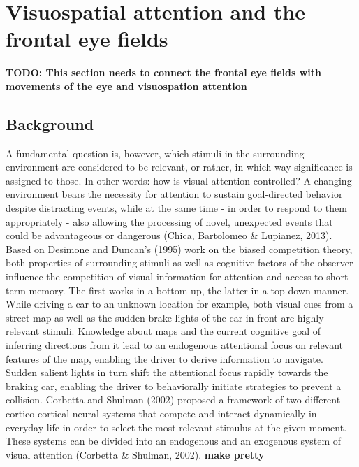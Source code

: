 \documentclass[a4paper, 12pt]{scrreprt}
\begin{document}
\section{Visuospatial attention and the frontal eye fields}
\textbf{TODO: This section needs to connect the frontal eye fields with movements of the eye and visuospation attention}


\subsection{Background}\label{section:visualattention}
A fundamental question is, however, which stimuli in the surrounding environment are considered to be relevant, or rather, in which way significance is assigned to those. In other words: how is visual attention controlled? A changing environment bears the necessity for attention to sustain goal-directed behavior despite distracting events, while at the same time - in order to respond to them appropriately - also allowing the processing of novel, unexpected events that could be advantageous or dangerous (Chica, Bartolomeo \& Lupianez, 2013). Based on Desimone and Duncan’s (1995) work on the biased competition theory, both properties of surrounding stimuli as well as cognitive factors of the observer influence the competition of visual information for attention and access to short term memory. The first works in a bottom-up, the latter in a top-down manner. While driving a car to an unknown location for example, both visual cues from a street map as well as the sudden brake lights of the car in front are highly relevant stimuli. Knowledge about maps and the current cognitive goal of inferring directions from it lead to an endogenous attentional focus on relevant features of the map, enabling the driver to derive information to navigate. Sudden salient lights in turn shift the attentional focus rapidly towards the braking car, enabling the driver to behaviorally initiate strategies to prevent a collision. Corbetta and Shulman (2002) proposed a framework of two different cortico-cortical neural systems that compete and interact dynamically in everyday life in order to select the most relevant stimulus at the given moment. These systems can be divided into an endogenous and an exogenous system of visual attention (Corbetta \& Shulman, 2002). \textbf{make pretty}
\\
\end{document}

